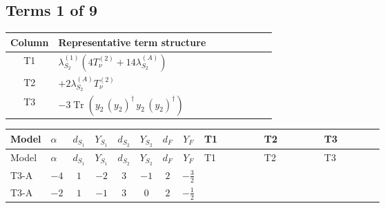 \documentclass[8pt]{article}
\begin{document}
\begin{landscape}
\subsection*{Terms 1 of 9}
\begin{center}
\begin{tabular}{@{}c >{\raggedright\arraybackslash}p{0.82\linewidth}@{}}
\toprule
Column & Representative term structure \\
\midrule
T1 & \(\displaystyle {\lambda_{S_2}^{(1)}} (4 T_{\nu}^{(2)}+14 {\lambda_{S_2}^{(A)}})\) \\
\midrule
T2 & \(\displaystyle +2 {\lambda_{S_2}^{(A)}} T_{\nu}^{(2)}\) \\
\midrule
T3 & \(\displaystyle -3 \operatorname{Tr}\!\left({y_2}\,\left({y_2}\right)^{\dagger}\,{y_2}\,\left({y_2}\right)^{\dagger}\right)\) \\
\midrule
\bottomrule
\end{tabular}
\end{center}
\smallskip
\tiny
\begin{longtable}{@{}llcccccc >{\raggedright\arraybackslash}p{0.21\linewidth} >{\raggedright\arraybackslash}p{0.21\linewidth} >{\raggedright\arraybackslash}p{0.21\linewidth}@{}}
\toprule
Model & $\alpha$ & $d_{S_1}$ & $Y_{S_1}$ & $d_{S_2}$ & $Y_{S_2}$ & $d_F$ & $Y_F$ & T1 & T2 & T3 \\
\midrule
\endfirsthead
\toprule
Model & $\alpha$ & $d_{S_1}$ & $Y_{S_1}$ & $d_{S_2}$ & $Y_{S_2}$ & $d_F$ & $Y_F$ & T1 & T2 & T3 \\
\midrule
\endhead
T3-A & $-4$ & $1$ & $-2$ & $3$ & $-1$ & $2$ & $-\frac{3}{2}$ & \scriptsize\adjustbox{max width=\linewidth}{$\begin{gathered} {\lambda_{S_2}^{(1)}} (4 T_{\nu}^{(2)}+14 {\lambda_{S_2}^{(A)}})\end{gathered}$} & \scriptsize\adjustbox{max width=\linewidth}{$\begin{gathered} +2 {\lambda_{S_2}^{(A)}} T_{\nu}^{(2)}\end{gathered}$} & \scriptsize\adjustbox{max width=\linewidth}{$\begin{gathered} -3 \operatorname{Tr}\!\left({y_2}\,\left({y_2}\right)^{\dagger}\,{y_2}\,\left({y_2}\right)^{\dagger}\right)\end{gathered}$} \\
\midrule
T3-A & $-2$ & $1$ & $-1$ & $3$ & $0$ & $2$ & $-\frac{1}{2}$ & \scriptsize\adjustbox{max width=\linewidth}{$\begin{gathered} {\lambda_{S_2}^{(1)}} (4 T_{\nu}^{(2)}+14 {\lambda_{S_2}^{(A)}})\end{gathered}$} & \scriptsize\adjustbox{max width=\linewidth}{$\begin{gathered} +2 {\lambda_{S_2}^{(A)}} T_{\nu}^{(2)}\end{gathered}$} & \scriptsize\adjustbox{max width=\linewidth}{$\begin{gathered} -3 \operatorname{Tr}\!\left({y_2}\,\left({y_2}\right)^{\dagger}\,{y_2}\,\left({y_2}\right)^{\dagger}\right)\end{gathered}$} \\

\end{longtable}
\end{landscape}
\end{document}
